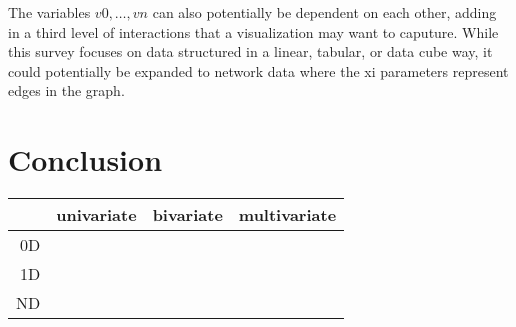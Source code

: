 \documentclass[letterpaper,onecolumn,titlepage]{Ythesis}
\begin{document}
The variables $v0,\dots, vn$ can also potentially be dependent on each other,
adding in a third level of interactions that a visualization may want to
caputure. While this survey focuses on data structured in a linear, tabular, or
data cube way, it could potentially be expanded to network data where the xi
parameters represent edges in the graph. 




\section{Conclusion}
\label{sec:conclusion}

\begin{tabular}{|r|r|r|r|}
  \hline
              & univariate & bivariate & multivariate\\
  \hline
   0D         &            &           &             \\
  \hline
   1D         &            &           &             \\
   \hline
   ND         &            &           &             \\
\end{tabular}

\pagebreak
\printbibliography
\end{document}
